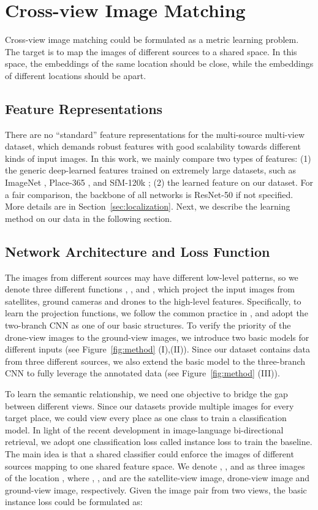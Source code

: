 \documentclass[sigconf]{acmart}
\begin{document}
\section{Cross-view Image Matching} \label{method}
Cross-view image matching could be formulated as a metric learning problem. The target is to map the images of different sources to a shared space. In this space, the embeddings of the same location should be close, while the embeddings of different locations should be apart. 

\subsection{Feature Representations}
There are no ``standard'' feature representations for the multi-source multi-view dataset, which demands robust features with good scalability towards different kinds of input images. In this work, we mainly compare two types of features: (1) the generic deep-learned features trained on extremely large datasets, such as ImageNet \cite{deng2009imagenet}, Place-365 \cite{zhou2017places}, and SfM-120k \cite{radenovic2018fine};  (2) the learned feature on our dataset. For a fair comparison, the backbone of all networks is ResNet-50 \cite{he2016deep} if not specified. More details are in Section~\ref{sec:localization}. Next, we describe the learning method on our data in the following section.

\subsection{Network Architecture and Loss Function}
The images from different sources may have different low-level patterns, so we denote three different functions , , and , which project the input images from satellites, ground cameras and drones to the high-level features. Specifically, to learn the projection functions, we follow the common practice in \cite{lin2015learning,liu2019lending}, and adopt the two-branch CNN as one of our basic structures. To verify the priority of the drone-view images to the ground-view images, we introduce two basic models for different inputs (see Figure~\ref{fig:method} (I),(II)). 
Since our dataset contains data from three different sources, we also extend the basic model to the three-branch CNN to fully leverage the annotated data (see Figure~\ref{fig:method} (III)). 

To learn the semantic relationship, we need one objective to bridge the gap between different views. Since our datasets provide multiple images for every target place, we could view every place as one class to train a classification model. In light of the recent development in image-language bi-directional retrieval, we adopt one classification loss called instance loss \cite{zheng2017dual} to train the baseline. The main idea is that a shared classifier could enforce the images of different sources mapping to one shared feature space. We denote , , and  as three images of the location , where , , and  are the satellite-view image, drone-view image and ground-view image, respectively. Given the image pair  from two views, the basic instance loss could be formulated as: 
\end{document}

